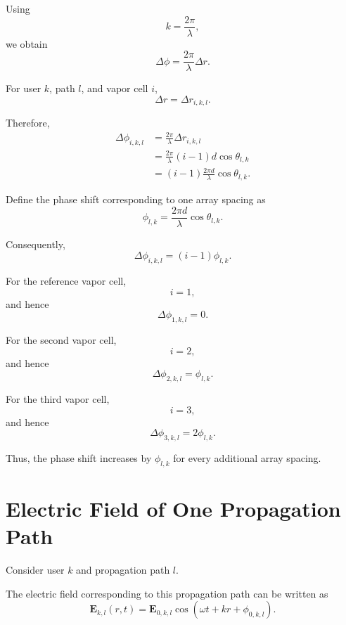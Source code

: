 \documentclass[12pt,a4paper]{article}
\begin{document}
Using
\[
k=\frac{2\pi}{\lambda},
\]
we obtain
\begin{equation}
\boxed{
\Delta\phi
=
\frac{2\pi}{\lambda}\Delta r.
}
\tag{7}
\end{equation}

For user \(k\), path \(l\), and vapor cell \(i\),
\[
\Delta r
=
\Delta r_{i,k,l}.
\]

Therefore,
\[
\begin{aligned}
\Delta\phi_{i,k,l}
&=
\frac{2\pi}{\lambda}
\Delta r_{i,k,l}\\
&=
\frac{2\pi}{\lambda}
(i-1)d\cos\theta_{l,k}\\
&=
(i-1)
\frac{2\pi d}{\lambda}
\cos\theta_{l,k}.
\end{aligned}
\]

Define the phase shift corresponding to one array spacing as
\begin{equation}
\boxed{
\phi_{l,k}
=
\frac{2\pi d}{\lambda}
\cos\theta_{l,k}.
}
\tag{8}
\end{equation}

Consequently,
\begin{equation}
\boxed{
\Delta\phi_{i,k,l}
=
(i-1)\phi_{l,k}.
}
\tag{9}
\end{equation}

For the reference vapor cell,
\[
i=1,
\]
and hence
\[
\Delta\phi_{1,k,l}=0.
\]

For the second vapor cell,
\[
i=2,
\]
and hence
\[
\Delta\phi_{2,k,l}=\phi_{l,k}.
\]

For the third vapor cell,
\[
i=3,
\]
and hence
\[
\Delta\phi_{3,k,l}=2\phi_{l,k}.
\]

Thus, the phase shift increases by \(\phi_{l,k}\) for every
additional array spacing.



\section{Electric Field of One Propagation Path}

Consider user \(k\) and propagation path \(l\).

The electric field corresponding to this propagation path can be
written as
\begin{equation}
\mathbf E_{k,l}(r,t)
=
\mathbf E_{0,k,l}
\cos
\left(
\omega t+kr+\phi_{0,k,l}
\right).
\tag{10}
\end{equation}
\end{document}
